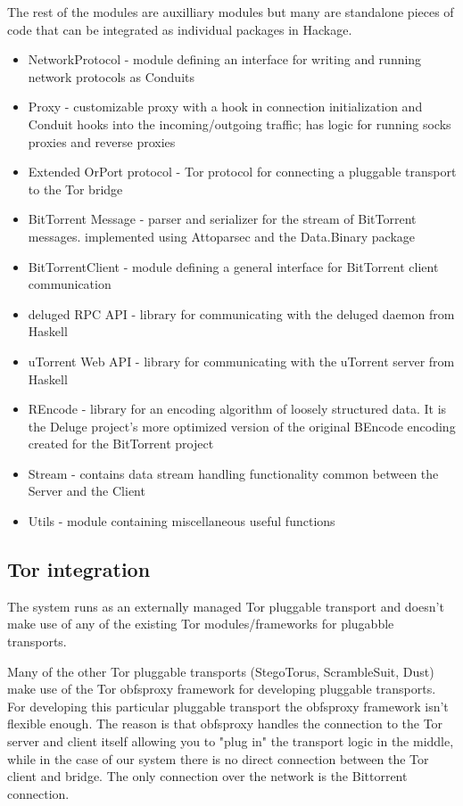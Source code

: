 \documentclass[11pt]{book} %
\begin{document}
The rest of the modules are auxilliary modules but many are standalone pieces of code that can be integrated as individual packages in Hackage.

\begin{itemize}
\item NetworkProtocol - module defining an interface for writing and running network protocols as Conduits
\item Proxy - customizable proxy with a hook in connection initialization and Conduit hooks into the incoming/outgoing traffic; has logic for running socks proxies and reverse proxies
\item Extended OrPort protocol  - Tor protocol for connecting a pluggable transport to the Tor bridge
\item BitTorrent Message  - parser and serializer for the stream of BitTorrent messages. implemented using Attoparsec and the Data.Binary package
\item BitTorrentClient - module defining a general interface for BitTorrent client communication
\item deluged RPC API - library for communicating with the deluged daemon from Haskell
\item uTorrent Web API - library for communicating with the uTorrent server from Haskell
\item REncode - library for an encoding algorithm of loosely structured data. It is the Deluge project's more optimized version of the original BEncode encoding created for the BitTorrent project 
\item Stream - contains data stream handling functionality common between the Server and the Client
\item Utils - module containing miscellaneous useful functions
\end{itemize}


\subsection{Tor integration}

The system runs as an externally managed Tor pluggable transport and doesn't make use of any of the existing Tor modules/frameworks for plugabble transports.

Many of the other Tor pluggable transports (StegoTorus, ScrambleSuit, Dust) make use of the Tor obfsproxy  framework for developing pluggable transports. For developing this particular pluggable transport the obfsproxy framework isn't flexible enough. The reason is that obfsproxy handles the connection to the Tor server and client itself allowing you to "plug in" the transport logic in the middle, while in the case of our system there is no direct connection between the Tor client and bridge. The only connection over the network is the Bittorrent connection.
\end{document}
